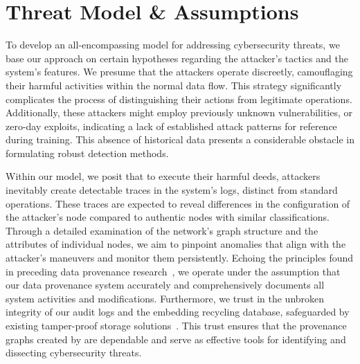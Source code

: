 
\section{Threat Model \& Assumptions}

To develop an all-encompassing model for addressing cybersecurity threats, we base our approach on certain hypotheses regarding the attacker's tactics and the system's features. We presume that the attackers operate discreetly, camouflaging their harmful activities within the normal data flow. This strategy significantly complicates the process of distinguishing their actions from legitimate operations. Additionally, these attackers might employ previously unknown vulnerabilities, or zero-day exploits, indicating a lack of established attack patterns for reference during training. This absence of historical data presents a considerable obstacle in formulating robust detection methods.


Within our model, we posit that to execute their harmful deeds, attackers inevitably create detectable traces in the system's logs, distinct from standard operations. These traces are expected to reveal differences in the configuration of the attacker's node compared to authentic nodes with similar classifications. Through a detailed examination of the network's graph structure and the attributes of individual nodes, we aim to pinpoint anomalies that align with the attacker's maneuvers and monitor them persistently. Echoing the principles found in preceding data provenance research~\cite{nodoze2019,priotracker2018,mzx2016,bates2017transparent}, we operate under the assumption that our data provenance system accurately and comprehensively documents all system activities and modifications. Furthermore, we trust in the unbroken integrity of our audit logs and the embedding recycling database, safeguarded by existing tamper-proof storage solutions~\cite{paccagnella2020custos,hardlog}. This trust ensures that the provenance graphs created by \Sys are dependable and serve as effective tools for identifying and dissecting cybersecurity threats.